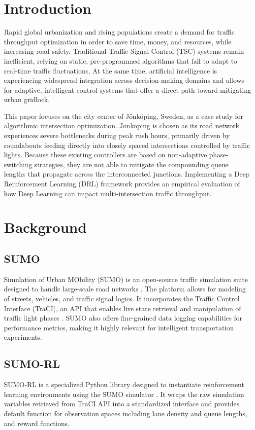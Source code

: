 \documentclass[conference]{IEEEtran}
\begin{document}
\section{Introduction}
Rapid global urbanization and rising populations create a demand for traffic throughput optimization in order to save time, money, and resources, while increasing road safety. Traditional Traffic Signal Control (TSC) systems remain inefficient, relying on static, pre-programmed algorithms that fail to adapt to real-time traffic fluctuations. At the same time, artificial intelligence is experiencing widespread integration across decision-making domains and allows for adaptive, intelligent control systems that offer a direct path toward mitigating urban gridlock.

This paper focuses on the city center of Jönköping, Sweden, as a case study for algorithmic intersection optimization. Jönköping is chosen as its road network experiences severe bottlenecks during peak rush hours, primarily driven by roundabouts feeding directly into closely spaced intersections controlled by traffic lights. Because these existing controllers are based on non-adaptive phase-switching strategies, they are not able to mitigate the compounding queue lengths that propagate across the interconnected junctions. Implementing a Deep Reinforcement Learning (DRL) framework provides an empirical evaluation of how Deep Learning can impact multi-intersection traffic throughput.

\section{Background}

\subsection{SUMO}
Simulation of Urban MObility (SUMO) is an open-source traffic simulation suite designed to handle large-scale road networks \cite{sumo}. The platform allows for modeling of streets, vehicles, and traffic signal logics. It incorporates the Traffic Control Interface (TraCI), an API that enables live state retrieval and manipulation of traffic light phases \cite{traci}. SUMO also offers fine-grained data logging capabilities for performance metrics, making it highly relevant for intelligent transportation experiments.

\subsection{SUMO-RL}
SUMO-RL is a specialized Python library designed to instantiate reinforcement learning environments using the SUMO simulator \cite{sumorl}. It wraps the raw simulation variables retrieved from TraCI API into a standardized interface and provides default function for observation spaces including lane density and queue lengths, and reward functions.
\end{document}
